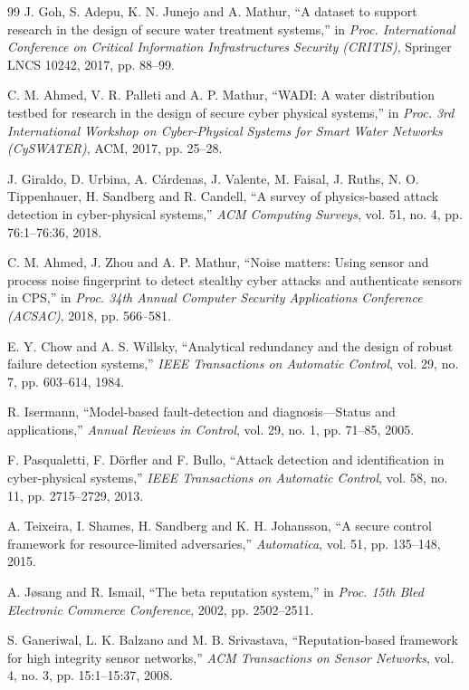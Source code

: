 \begin{thebibliography}{99}
 J. Goh, S. Adepu, K. N. Junejo and A. Mathur, ``A dataset to support research in the design of secure water treatment systems,'' in \emph{Proc. International Conference on Critical Information Infrastructures Security (CRITIS)}, Springer LNCS 10242, 2017, pp. 88--99.

 C. M. Ahmed, V. R. Palleti and A. P. Mathur, ``WADI: A water distribution testbed for research in the design of secure cyber physical systems,'' in \emph{Proc. 3rd International Workshop on Cyber-Physical Systems for Smart Water Networks (CySWATER)}, ACM, 2017, pp. 25--28.

 J. Giraldo, D. Urbina, A. C\'ardenas, J. Valente, M. Faisal, J. Ruths, N. O. Tippenhauer, H. Sandberg and R. Candell, ``A survey of physics-based attack detection in cyber-physical systems,'' \emph{ACM Computing Surveys}, vol. 51, no. 4, pp. 76:1--76:36, 2018.

 C. M. Ahmed, J. Zhou and A. P. Mathur, ``Noise matters: Using sensor and process noise fingerprint to detect stealthy cyber attacks and authenticate sensors in CPS,'' in \emph{Proc. 34th Annual Computer Security Applications Conference (ACSAC)}, 2018, pp. 566--581.

 E. Y. Chow and A. S. Willsky, ``Analytical redundancy and the design of robust failure detection systems,'' \emph{IEEE Transactions on Automatic Control}, vol. 29, no. 7, pp. 603--614, 1984.

 R. Isermann, ``Model-based fault-detection and diagnosis---Status and applications,'' \emph{Annual Reviews in Control}, vol. 29, no. 1, pp. 71--85, 2005.

 F. Pasqualetti, F. D\"orfler and F. Bullo, ``Attack detection and identification in cyber-physical systems,'' \emph{IEEE Transactions on Automatic Control}, vol. 58, no. 11, pp. 2715--2729, 2013.

 A. Teixeira, I. Shames, H. Sandberg and K. H. Johansson, ``A secure control framework for resource-limited adversaries,'' \emph{Automatica}, vol. 51, pp. 135--148, 2015.

 A. J{\o}sang and R. Ismail, ``The beta reputation system,'' in \emph{Proc. 15th Bled Electronic Commerce Conference}, 2002, pp. 2502--2511.

 S. Ganeriwal, L. K. Balzano and M. B. Srivastava, ``Reputation-based framework for high integrity sensor networks,'' \emph{ACM Transactions on Sensor Networks}, vol. 4, no. 3, pp. 15:1--15:37, 2008.


\end{thebibliography}
